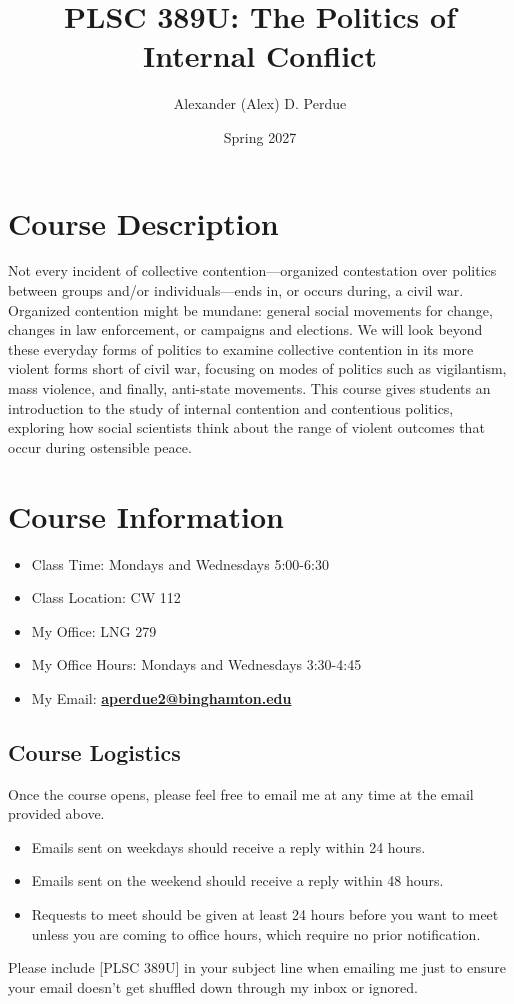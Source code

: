 \documentclass[12pt]{article}
\title{\textbf{PLSC 389U: The Politics of Internal Conflict}}
\author{Alexander (Alex) D. Perdue}
\date{Spring 2027}
\begin{document}
\maketitle

\section*{Course Description}
Not every incident of collective contention—organized contestation over politics between groups and/or individuals—ends in, or occurs during, a civil war. Organized contention might be mundane: general social movements for change, changes in law enforcement, or campaigns and elections. We will look beyond these everyday forms of politics to examine collective contention in its more violent forms short of civil war, focusing on modes of politics such as vigilantism, mass violence, and finally, anti-state movements. This course gives students an introduction to the study of internal contention and contentious politics, exploring how social scientists think about the range of violent outcomes that occur during ostensible peace.

\section*{Course Information}
\begin{itemize}
    \item Class Time: Mondays and Wednesdays 5:00-6:30
    \item Class Location: CW 112
    \item My Office: LNG 279
    \item My Office Hours: Mondays and Wednesdays 3:30-4:45
    \item My Email: \textbf{\textcolor{BingGreen}{\href{aperdue2@binghamton.edu}{aperdue2@binghamton.edu}}} 
\end{itemize}

\subsection*{Course Logistics}
\par{Once the course opens, please feel free to email me at any time at the email provided above. 
\begin{itemize}
    \item Emails sent on weekdays should receive a reply within 24 hours.
    \item Emails sent on the weekend should receive a reply within 48 hours.
    \item Requests to meet should be given at least 24 hours before you want to meet unless you are coming to office hours, which require no prior notification.
\end{itemize}
Please include [PLSC 389U] in your subject line when emailing me just to ensure your email doesn't get shuffled down through my inbox or ignored.}
\end{document}
